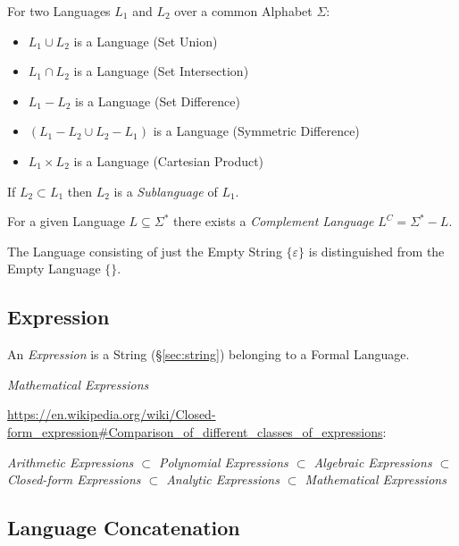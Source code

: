 For two Languages $L_1$ and $L_2$ over a common Alphabet $\Sigma$:
\begin{itemize}
  \item $L_1 \cup L_2$ is a Language (Set Union)
  \item $L_1 \cap L_2$ is a Language (Set Intersection)
  \item $L_1 - L_2$ is a Language (Set Difference)
  \item $(L_1 - L_2 \cup L_2 - L_1)$ is a Language (Symmetric Difference)
  \item $L_1 \times L_2$ is a Language (Cartesian Product)
\end{itemize}
If $L_2 \subset L_1$ then $L_2$ is a \emph{Sublanguage} of $L_1$.

For a given Language $L \subseteq \Sigma^*$ there exists a \emph{Complement
  Language} $L^C = \Sigma^* - L$.

The Language consisting of just the Empty String $\{\varepsilon\}$ is
distinguished from the Empty Language $\{\}$.



\subsection{Expression}\label{sec:expression}

An \emph{Expression} is a String (\S\ref{sec:string}) belonging to a Formal
Language.

\emph{Mathematical Expressions}

\url{https://en.wikipedia.org/wiki/Closed-form_expression#Comparison_of_different_classes_of_expressions}:

\emph{
Arithmetic Expressions $\subset$ Polynomial Expressions $\subset$ Algebraic
Expressions $\subset$ Closed-form Expressions $\subset$ Analytic Expressions
$\subset$ Mathematical Expressions
}




\subsection{Language Concatenation}\label{sec:language_concatenation}

